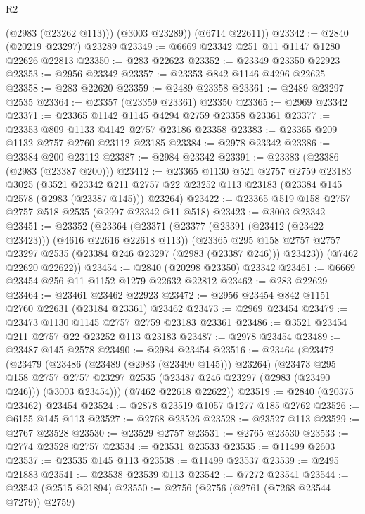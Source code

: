 \begin{lexlean}{R2}
\begin{coremodule}
          (@2983 (@23262 @113)))
        (@3003 @23289))
      (@6714 @22611))
@23342 := @2840 (@20219 @23297) @23289
@23349 := @6669 @23342 @251 @11 @1147 @1280 @22626 @22813
@23350 := @283 @22623
@23352 := @23349 @23350 @22923
@23353 := @2956 @23342
@23357 := @23353 @842 @1146 @4296 @22625
@23358 := @283 @22620
@23359 := @2489 @23358
@23361 := @2489 @23297 @2535
@23364 := @23357 (@23359 @23361) @23350
@23365 := @2969 @23342
@23371 := @23365 @1142 @1145 @4294 @2759 @23358 @23361
@23377 := @23353 @809 @1133 @4142 @2757 @23186 @23358
@23383 := @23365 @209 @1132 @2757 @2760 @23112 @23185
@23384 := @2978 @23342
@23386 := @23384 @200 @23112
@23387 := @2984 @23342
@23391 := @23383 (@23386 (@2983 (@23387 @200)))
@23412 := @23365
    @1130
    @521
    @2757
    @2759
    @23183
    @3025
    (@3521
      @23342
      @211
      @2757
      @22
      @23252
      @113
      @23183
      (@23384 @145 @2578 (@2983 (@23387 @145)))
      @23264)
@23422 := @23365 @519 @158 @2757 @2757 @518 @2535 (@2997 @23342 @11 @518)
@23423 := @3003 @23342
@23451 := @23352
    (@23364
      (@23371
        (@23377 (@23391 (@23412 (@23422 @23423))) (@4616 @22616 @22618 @113))
        (@23365
          @295
          @158
          @2757
          @2757
          @23297
          @2535
          (@23384 @246 @23297 (@2983 (@23387 @246)))
          @23423))
      (@7462 @22620 @22622))
@23454 := @2840 (@20298 @23350) @23342
@23461 := @6669 @23454 @256 @11 @1152 @1279 @22632 @22812
@23462 := @283 @22629
@23464 := @23461 @23462 @22923
@23472 := @2956 @23454 @842 @1151 @2760 @22631 (@23184 @23361) @23462
@23473 := @2969 @23454
@23479 := @23473 @1130 @1145 @2757 @2759 @23183 @23361
@23486 := @3521 @23454 @211 @2757 @22 @23252 @113 @23183
@23487 := @2978 @23454
@23489 := @23487 @145 @2578
@23490 := @2984 @23454
@23516 := @23464
    (@23472
      (@23479
        (@23486 (@23489 (@2983 (@23490 @145))) @23264)
        (@23473
          @295
          @158
          @2757
          @2757
          @23297
          @2535
          (@23487 @246 @23297 (@2983 (@23490 @246)))
          (@3003 @23454)))
      (@7462 @22618 @22622))
@23519 := @2840 (@20375 @23462) @23454
@23524 := @2878 @23519 @1057 @1277 @185 @2762
@23526 := @6155 @145 @113
@23527 := @2768 @23526
@23528 := @23527 @113
@23529 := @2767 @23528
@23530 := @23529 @2757
@23531 := @2765 @23530
@23533 := @2774 @23528 @2757
@23534 := @23531 @23533
@23535 := @11499 @2603
@23537 := @23535 @145 @113
@23538 := @11499 @23537
@23539 := @2495 @21883
@23541 := @23538 @23539 @113
@23542 := @7272 @23541
@23544 := @23542 (@2515 @21894)
@23550 := @2756 (@2756 (@2761 (@7268 @23544 @7279)) @2759)

\end{coremodule}
\end{lexlean}
